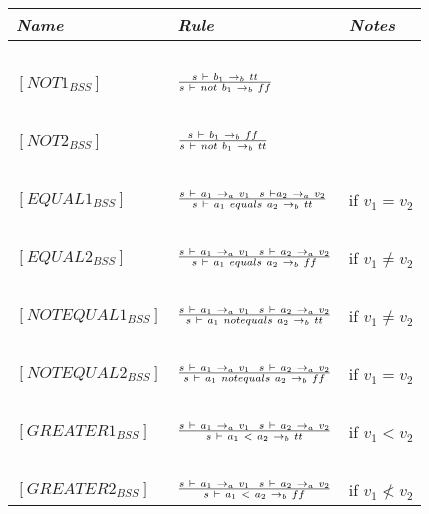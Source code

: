\begin{table}[h]
	\begin{tabular}{|l|l|l|}
	\hline
	\emph{Name}			& \emph{Rule}																															& \emph{Notes} \\ \hline
			~			&															~																			& ~ \\
	$[NOT1_{BSS}]$		& $s~\vdash~b_{1}~\rightarrow_{b}~tt \over s~\vdash~not~b_{1}~\rightarrow_{b}~ff$														& ~ \\
			~			&															~																			& ~ \\
	$[NOT2_{BSS}]$		& $s~\vdash~b_{1}~\rightarrow_{b}~ff \over s~\vdash~not~b_{1}~\rightarrow_{b}~tt$														& ~ \\
			~			&															~																			& ~ \\
	$[EQUAL1_{BSS}]$	& $s~\vdash~a_{1}~\rightarrow_{a}~v_{1}~~s~\vdash a_{2}~\rightarrow_{a}~v_{2} \over s~\vdash~a_{1}~equals~a_{2}~\rightarrow_{b}~tt$		& if $v_{1} = v_{2}$ \\
			~			&															~																			& ~ \\
	$[EQUAL2_{BSS}]$	& $s~\vdash~a_{1}~\rightarrow_{a}~v_{1}~~s~\vdash~a_{2}~
	\rightarrow_{a}~v_{2} \over s~\vdash~a_{1}~equals~a_{2}~\rightarrow_{b}~ff$		& if $v_{1} \ne v_{2}$ \\
			~			&															~																			& ~ \\
	$[NOTEQUAL1_{BSS}]$	& $s~\vdash~a_{1}~\rightarrow_{a}~v_{1}~~s~\vdash~a_{2}~
	\rightarrow_{a}~v_{2} \over s~\vdash~a_{1}~notequals~a_{2}~\rightarrow_{b}~tt$	& if $v_{1}\ne v_{2}$ \\
			~			&															~																			& ~ \\
	$[NOTEQUAL2_{BSS}]$	& $s~\vdash~a_{1}~\rightarrow_{a}~v_{1}~~s~
	\vdash~a_{2}~\rightarrow_{a}~v_{2} \over s~\vdash~a_{1}~notequals~a_{2}~\rightarrow_{b}~ff$	& if $v_{1} = v_{2}$ \\
			~			&															~																			& ~ \\
	$[GREATER1_{BSS}]$	& $s~\vdash~a_{1}~\rightarrow_{a}~v_{1}~~s~
	\vdash~a_{2}~\rightarrow_{a}~v_{2} \over s~\vdash~a_{1}~<~a_{2}~\rightarrow_{b}~tt$			& if $v_{1} < v_{2}$ \\
			~			&															~																			& ~ \\
	$[GREATER2_{BSS}]$	& $s~\vdash~a_{1}~\rightarrow_{a}~v_{1}~~s~
	\vdash~a_{2}~\rightarrow_{a}~v_{2} \over s~\vdash~a_{1}~<~a_{2}~\rightarrow_{b}~ff$			& if $v_{1} \not< v_{2}$ \\

\end{tabular}
\end{table}
